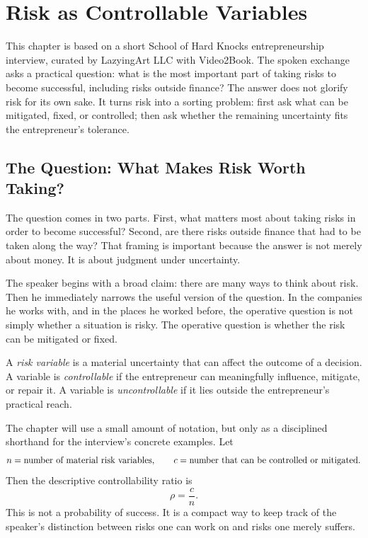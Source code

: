 \chapter{Risk as Controllable Variables}

This chapter is based on a short School of Hard Knocks entrepreneurship interview, curated by LazyingArt LLC with Video2Book. The spoken exchange asks a practical question: what is the most important part of taking risks to become successful, including risks outside finance? The answer does not glorify risk for its own sake. It turns risk into a sorting problem: first ask what can be mitigated, fixed, or controlled; then ask whether the remaining uncertainty fits the entrepreneur's tolerance.

\section{The Question: What Makes Risk Worth Taking?}

The question comes in two parts. First, what matters most about taking risks in order to become successful? Second, are there risks outside finance that had to be taken along the way? That framing is important because the answer is not merely about money. It is about judgment under uncertainty.

The speaker begins with a broad claim: there are many ways to think about risk. Then he immediately narrows the useful version of the question. In the companies he works with, and in the places he worked before, the operative question is not simply whether a situation is risky. The operative question is whether the risk can be mitigated or fixed.

\begin{definition}
A \emph{risk variable} is a material uncertainty that can affect the outcome of a decision. A variable is \emph{controllable} if the entrepreneur can meaningfully influence, mitigate, or repair it. A variable is \emph{uncontrollable} if it lies outside the entrepreneur's practical reach.
\end{definition}

The chapter will use a small amount of notation, but only as a disciplined shorthand for the interview's concrete examples. Let
\begin{equation}
n=\hbox{number of material risk variables}, \qquad
c=\hbox{number that can be controlled or mitigated}.
\end{equation}
Then the descriptive controllability ratio is
\begin{equation}
\rho=\frac{c}{n}.
\end{equation}
This is not a probability of success. It is a compact way to keep track of the speaker's distinction between risks one can work on and risks one merely suffers.

